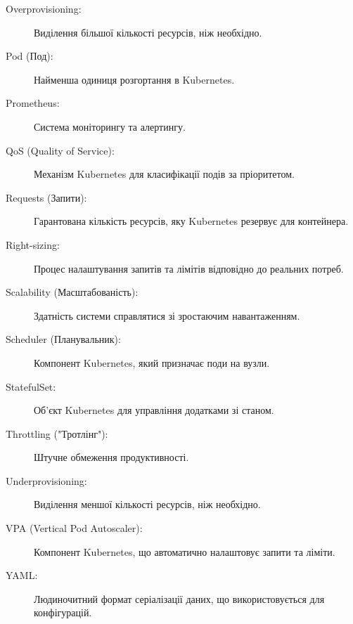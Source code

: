 \begin{description}
	\item[Overprovisioning:] Виділення більшої кількості ресурсів, ніж необхідно. 
	\item[Pod (Под):] Найменша одиниця розгортання в Kubernetes. 
	\item[Prometheus:] Система моніторингу та алертингу. 
	\item[QoS (Quality of Service):] Механізм Kubernetes для класифікації подів за пріоритетом. 
	\item[Requests (Запити):] Гарантована кількість ресурсів, яку Kubernetes резервує для контейнера. 
	\item[Right-sizing:] Процес налаштування запитів та лімітів відповідно до реальних потреб. 
	\item[Scalability (Масштабованість):] Здатність системи справлятися зі зростаючим навантаженням. 
	\item[Scheduler (Планувальник):] Компонент Kubernetes, який призначає поди на вузли. 
	\item[StatefulSet:] Об'єкт Kubernetes для управління додатками зі станом. 
	\item[Throttling ("Тротлінг"):] Штучне обмеження продуктивності. 
	\item[Underprovisioning:] Виділення меншої кількості ресурсів, ніж необхідно. 
	\item[VPA (Vertical Pod Autoscaler):] Компонент Kubernetes, що автоматично налаштовує запити та ліміти. 
	\item[YAML:] Людиночитний формат серіалізації даних, що використовується для конфігурацій. 
\end{description}